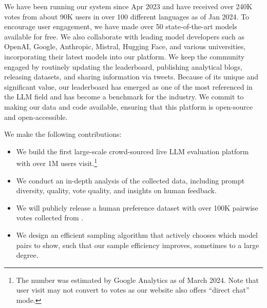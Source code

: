 We have been running our system since Apr 2023 and have received over 240K votes from about 90K users in over 100 different languages as of Jan 2024.
To encourage user engagement, we have made over 50 state-of-the-art models available for free.
We also collaborate with leading model developers such as OpenAI, Google, Anthropic, Mistral, Hugging Face, and various universities, incorporating their latest models into our platform. We keep the community engaged by routinely updating the leaderboard, publishing analytical blogs, releasing datasets, and sharing information via tweets. 
Because of its unique and significant value, our leaderboard has emerged as one of the most referenced in the LLM field and has become a benchmark for the industry.
We commit to making our data and code available, ensuring that this platform is open-source and open-accessible.


We make the following contributions:
\begin{itemize}[itemsep=0.1em]
    \item We build the first large-scale crowd-sourced live LLM evaluation platform with over 1M users visit.\footnote{The number was estimated by Google Analytics as of March 2024. Note that user visit may not convert to votes as our website also offers ``direct chat'' mode.}
    \item We conduct an in-depth analysis of the collected data, including prompt diversity, quality, vote quality, and insights on human feedback.
    \item We will publicly release a human preference dataset with over 100K pairwise votes collected from \system.
    \item We design an efficient sampling algorithm that actively chooses which model pairs to show, such that our sample efficiency improves, sometimes to a large degree.
\end{itemize}







